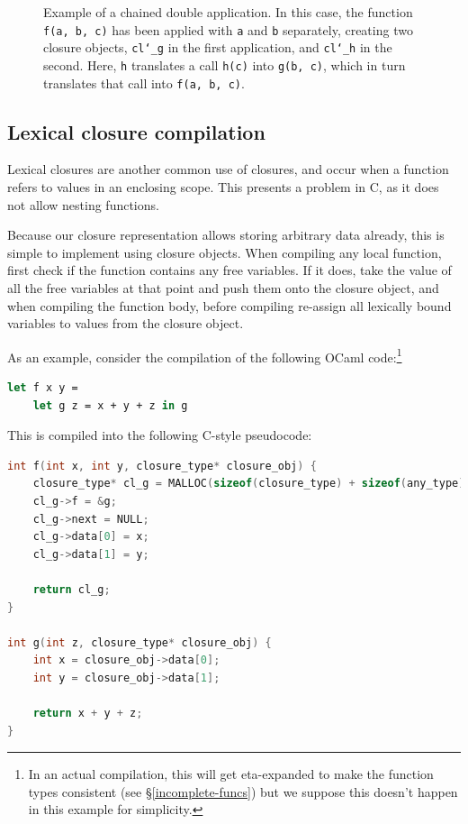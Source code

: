 \documentclass[12pt,a4paper,twoside,openright]{report}
\begin{document}
\begin{figure}
    \centering
    
    \caption{Example of a chained double application. In this case, the 
    function \texttt{f(a, b, c)} has been applied with \texttt{a} and 
    \texttt{b} separately, creating two closure objects, \texttt{cl\char`_g} in 
    the first application, and \texttt{cl\char`_h} in the second. Here, 
    \texttt{h} translates a call \texttt{h(c)} into \texttt{g(b, c)}, which in 
    turn translates that call into \texttt{f(a, b, c)}.}
    \label{fig:double-partial-app}
\end{figure}

\subsection{Lexical closure compilation}

Lexical closures are another common use of closures, and occur when a function
refers to values in an enclosing scope. This presents a problem in C, as it does
not allow nesting functions.

Because our closure representation allows storing arbitrary data already, this
is simple to implement using closure objects. When compiling any local function,
first check if the function contains any free variables. If it does, take the
value of all the free variables at that point and push them onto the closure
object, and when compiling the function body, before compiling re-assign all
lexically bound variables to values from the closure object.

As an example, consider the compilation of the following OCaml 
code:\footnote{In an actual compilation, this will get eta-expanded to make the 
function types consistent (see \S\ref{incomplete-funcs}) but we suppose 
this doesn't happen in this example for simplicity.}

\begin{lstlisting}[language=Caml]
let f x y =
    let g z = x + y + z in g
\end{lstlisting}

This is compiled into the following C-style pseudocode:

\begin{lstlisting}[language=C]
int f(int x, int y, closure_type* closure_obj) {
    closure_type* cl_g = MALLOC(sizeof(closure_type) + sizeof(any_type)*2);
    cl_g->f = &g;
    cl_g->next = NULL;
    cl_g->data[0] = x;
    cl_g->data[1] = y;
    
    return cl_g;
}

int g(int z, closure_type* closure_obj) {
    int x = closure_obj->data[0];
    int y = closure_obj->data[1];
    
    return x + y + z;
}
\end{lstlisting}
\end{document}
